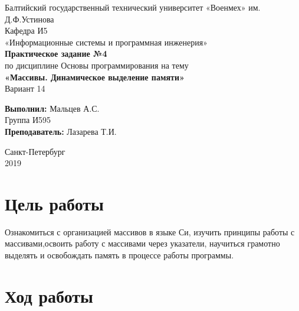 \documentclass[a4paper,14pt]{extarticle}
\begin{document}
\begin{titlepage}
\centering
\small Балтийский государственный технический университет «Военмех» им. Д.Ф.Устинова \\
\vspace{3cm}
\normalsize Кафедра И5\\
«Информационные системы и программная инженерия»\\
\vspace{3cm}
\textbf{Практическое задание №4}\\
по дисциплине Основы программирования на тему\\ 
\textbf{«Массивы. Динамическое выделение памяти»}\\
Вариант 14
\vfill

\begin{flushleft}
\textbf{Выполнил:}
\hfill {Мальцев А.С.} \\
\hfill {Группа И595} \\
\vspace{1cm}
\textbf{Преподаватель:}
\hfill {Лазарева Т.И.} \\
\end{flushleft}
\vspace{3cm}

{\centering Санкт-Петербург \\ 
\vspace{0.15cm}
2019}
\end{titlepage}
\setcounter{page}{2}
\section{Цель работы}
Ознакомиться с организацией массивов в языке Си, изучить принципы работы с массивами,освоить работу с массивами через указатели, научиться грамотно выделять и освобождать память в процессе работы программы.

\section{Ход работы}
\end{document}

